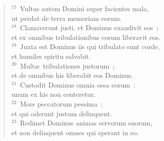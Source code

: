 \begin{flushleft}
\begin{verse}
${}^{17}$~Vultus autem Domini super facientes mala,\\ ut perdat de terra memoriam eorum.\\
${}^{18}$~Clamaverunt justi, et Dominus exaudivit eos~;\\ et ex omnibus tribulationibus eorum liberavit eos.\\
${}^{19}$~Juxta est Dominus iis qui tribulato sunt corde,\\ et humiles spiritu salvabit.\\
${}^{20}$~Mult\ae\ tribulationes justorum~;\\ et de omnibus his liberabit eos Dominus.\\
${}^{21}$~Custodit Dominus omnia ossa eorum~:\\ unum ex his non conteretur.\\
${}^{22}$~Mors peccatorum pessima~;\\ et qui oderunt justum delinquent.\\
${}^{23}$~Redimet Dominus animas servorum suorum,\\ et non delinquent omnes qui sperant in eo.\end{verse}\end{flushleft}




